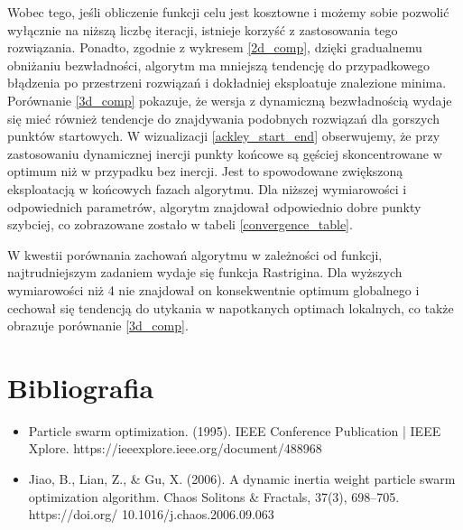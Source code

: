 \documentclass[12pt]{article}
\begin{document}
Wobec tego, jeśli obliczenie funkcji celu jest kosztowne i możemy sobie pozwolić wyłącznie na niższą liczbę iteracji, istnieje korzyść z zastosowania tego rozwiązania.
Ponadto, zgodnie z wykresem \ref{2d_comp}, dzięki gradualnemu obniżaniu bezwładności, algorytm ma mniejszą tendencję do przypadkowego błądzenia po przestrzeni rozwiązań i
dokładniej eksploatuje znalezione minima. Porównanie \ref{3d_comp} pokazuje, że wersja z dynamiczną bezwładnością wydaje się mieć również tendencje do znajdywania podobnych
rozwiązań dla gorszych punktów startowych. W wizualizacji \ref{ackley_start_end} obserwujemy, że przy zastosowaniu dynamicznej inercji punkty końcowe są gęściej skoncentrowane
w optimum niż w przypadku bez inercji. Jest to spowodowane zwiększoną eksploatacją w końcowych fazach algorytmu. Dla niższej wymiarowości i odpowiednich parametrów, algorytm znajdował
odpowiednio dobre punkty szybciej, co zobrazowane zostało w tabeli \ref{convergence_table}.

W kwestii porównania zachowań algorytmu w zależności od funkcji, najtrudniejszym zadaniem wydaje się funkcja Rastrigina. Dla wyższych wymiarowości niż 4 nie znajdował on
konsekwentnie optimum globalnego i cechował się tendencją do utykania w napotkanych optimach lokalnych, co także obrazuje porównanie \ref{3d_comp}.

\section{Bibliografia}
\begin{itemize}
	\item{Particle swarm optimization. (1995). IEEE Conference Publication | IEEE Xplore. https://ieeexplore.ieee.org/document/488968}
	\item{Jiao, B., Lian, Z., \& Gu, X. (2006). A dynamic inertia weight particle swarm optimization algorithm. Chaos Solitons \& Fractals, 37(3), 698–705. https://doi.org/ 10.1016/j.chaos.2006.09.063}
\end{itemize}
\end{document}
